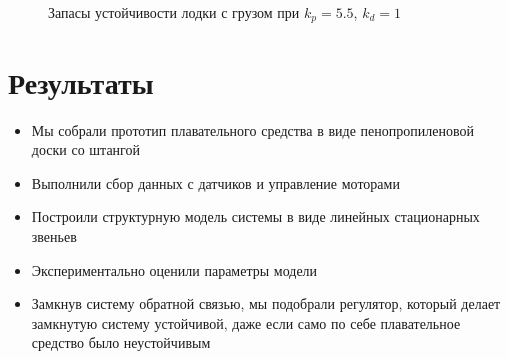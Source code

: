 \documentclass[12pt,a4paper]{article}
\begin{document}
\begin{figure}
	\caption{Запасы устойчивости лодки с грузом при $k_p=5.5$, $k_d=1$}
	\label{fig:bode_stable_cargo}
\end{figure}

\section{Результаты}

\begin{itemize}
	\item Мы собрали прототип плавательного средства в виде пенопропиленовой доски со штангой
	\item Выполнили сбор данных с датчиков и управление моторами
	\item Построили структурную модель системы в виде линейных стационарных звеньев
	\item Экспериментально оценили параметры модели
	\item Замкнув систему обратной связью, мы подобрали регулятор, который делает замкнутую систему устойчивой, даже если само по себе плавательное средство было неустойчивым
\end{itemize}
\end{document}
